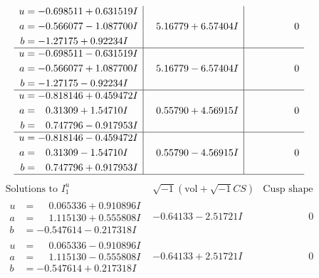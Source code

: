 \documentclass[1p]{elsarticle_modified}
\theoremstyle{definition}
\newcommand{\I}{\sqrt{-1}}
\begin{document}
$$\begin{array}{c|c|c}
\begin{aligned}
u &= -0.698511 + 0.631519 I \\
a &= -0.566077 - 1.087700 I \\
b &= -1.27175 + 0.92234 I\end{aligned}
 & \phantom{-}5.16779 + 6.57404 I & \phantom{-0.000000 } 0 \\ \hline\begin{aligned}
u &= -0.698511 - 0.631519 I \\
a &= -0.566077 + 1.087700 I \\
b &= -1.27175 - 0.92234 I\end{aligned}
 & \phantom{-}5.16779 - 6.57404 I & \phantom{-0.000000 } 0 \\ \hline\begin{aligned}
u &= -0.818146 + 0.459472 I \\
a &= \phantom{-}0.31309 + 1.54710 I \\
b &= \phantom{-}0.747796 - 0.917953 I\end{aligned}
 & \phantom{-}0.55790 + 4.56915 I & \phantom{-0.000000 } 0 \\ \hline\begin{aligned}
u &= -0.818146 - 0.459472 I \\
a &= \phantom{-}0.31309 - 1.54710 I \\
b &= \phantom{-}0.747796 + 0.917953 I\end{aligned}
 & \phantom{-}0.55790 - 4.56915 I & \phantom{-0.000000 } 0\\
 \hline 
 \end{array}$$\newpage$$\begin{array}{c|c|c}  
\text{Solutions to }I^u_{1}& \I (\text{vol} + \sqrt{-1}CS) & \text{Cusp shape}\\
 \hline 
\begin{aligned}
u &= \phantom{-}0.065336 + 0.910896 I \\
a &= \phantom{-}1.115130 + 0.555808 I \\
b &= -0.547614 - 0.217318 I\end{aligned}
 & -0.64133 - 2.51721 I & \phantom{-0.000000 } 0 \\ \hline\begin{aligned}
u &= \phantom{-}0.065336 - 0.910896 I \\
a &= \phantom{-}1.115130 - 0.555808 I \\
b &= -0.547614 + 0.217318 I\end{aligned}
 & -0.64133 + 2.51721 I & \phantom{-0.000000 } 0 \\ \hline\begin{aligned}

\end{aligned}
\end{array}$$
\end{document}
